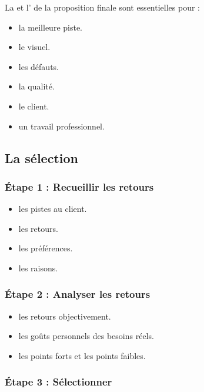 La  et l' de la proposition finale sont essentielles pour :

\begin{itemize}
    \item {} la meilleure piste.
    \item {} le visuel.
    \item {} les défauts.
    \item {} la qualité.
    \item {} le client.
    \item {} un travail professionnel.
\end{itemize}

\subsection{La sélection}

\subsubsection{Étape 1 : Recueillir les retours}

\begin{itemize}
    \item {} les pistes au client.
    \item {} les retours.
    \item {} les préférences.
    \item {} les raisons.
\end{itemize}

\subsubsection{Étape 2 : Analyser les retours}

\begin{itemize}
    \item {} les retours objectivement.
    \item {} les goûts personnels des besoins réels.
    \item {} les points forts et les points faibles.
\end{itemize}

\subsubsection{Étape 3 : Sélectionner}

